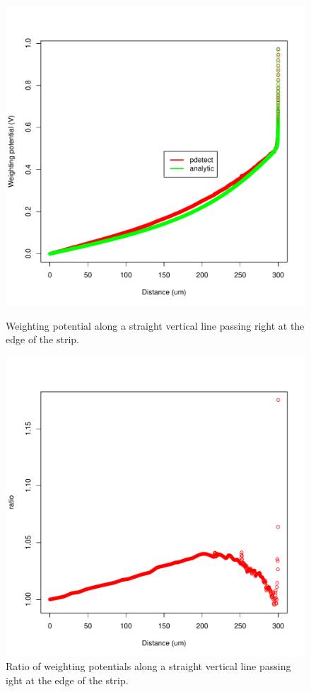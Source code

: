 \documentclass[11pt]{article}
\begin{document}
	\begin{figure}[H]
		\begin{minipage}[b]{.46\linewidth}
			\center
			\includegraphics[scale=0.5]{images/annexe/edge-strip.pdf}
			\caption{Weighting potential along a straight vertical line passing right at the edge
					of the strip.}
			\label{fig:edge_strip}
		\end{minipage} \hfill
		\begin{minipage}[b]{.46\linewidth}
			\center
			\includegraphics[scale=0.5]{images/annexe/edge-strip_ratio.pdf}
			\caption{Ratio of weighting potentials along a straight vertical line passing ight at the edge
					of the strip.}
			\label{fig:edge_strip_ratio}
		\end{minipage}
	\end{figure}
\end{document}
